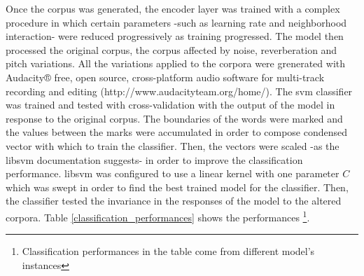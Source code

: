 \documentclass[11pt,a4paper]{article}
\begin{document}
Once the corpus was generated, the encoder layer was trained with a complex procedure
in which certain parameters -such as learning rate and neighborhood interaction- were
reduced progressively as training progressed. 
The model then processed the original corpus, the corpus affected by noise,
reverberation and pitch variations.
All the variations applied to the corpora were grenerated with
Audacity® free, open source, cross-platform audio software for
multi-track recording and editing
(http://www.audacityteam.org/home/).
The \gls{svm} classifier was trained and tested with cross-validation
with the output of the model in response to the original corpus.
The boundaries of the words were marked and the values between the marks
were accumulated in order to compose condensed vector with which to train
the classifier. Then, the vectors were scaled -as the \gls{libsvm} documentation suggests-
in order to improve the classification performance.
\gls{libsvm} was configured to use a linear kernel with one parameter $C$ which
was swept in order to find the best trained model for the classifier.
Then, the classifier tested the invariance in the responses of the model
to the altered corpora.
Table \ref{classification_performances} shows the performances
\footnote{Classification performances in the table come from different model's instances}. \\




\end{document}
